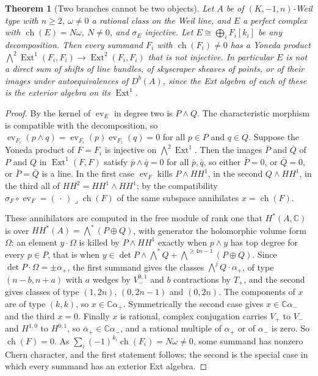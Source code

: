 \documentclass[11pt,reqno]{amsart}
\theoremstyle{plain}
\newtheorem{theorem}{Theorem}[section]
\theoremstyle{definition}
\theoremstyle{remark}
\newcommand{\CC}{\mathbb{C}}
\DeclareMathOperator{\ch}{ch}
\DeclareMathOperator{\Ext}{Ext}
\begin{document}
\begin{theorem}[Two branches cannot be two objects]\label{thm:nosum}
Let $A$ be of $(K,-1,n)$-Weil type with $n\ge2$, $\omega\ne0$ a rational class
on the Weil line, and $E$ a perfect complex with $\ch(E)=N\omega$, $N\ne0$, and
$\sigma_{E}$ injective. Let
$E\cong\bigoplus_{i}F_{i}[k_{i}]$ be any decomposition. Then every summand
$F_{i}$ with $\ch(F_{i})\ne0$ has a Yoneda product
$\bigwedge^{2}\Ext^{1}(F_{i},F_{i})\to\Ext^{2}(F_{i},F_{i})$ that is not
injective. In particular $E$ is not a direct sum of shifts of line bundles,
of skyscraper sheaves of points, or of their images under autoequivalences of
$D^{b}(A)$, since the Ext algebra of each of these is the exterior algebra on
its $\Ext^{1}$.
\end{theorem}

\begin{proof}
By \cite[Theorem~2.11(ii)]{paperII} the kernel of $\operatorname{ev}_{E}$ in degree
two is $P\wedge Q$. The characteristic morphism is compatible with the
decomposition, so $\operatorname{ev}_{F_{i}}(p\wedge q)=
\operatorname{ev}_{F_{i}}(p)\operatorname{ev}_{F_{i}}(q)=0$ for all
$p\in P$ and $q\in Q$. Suppose the Yoneda product of $F=F_{i}$ is injective on
$\bigwedge^{2}\Ext^{1}$. Then the images $\bar P$ and $\bar Q$ of $P$ and $Q$
in $\Ext^{1}(F,F)$ satisfy $\bar p\wedge\bar q=0$ for all $\bar p,\bar q$, so
either $\bar P=0$, or $\bar Q=0$, or $\bar P=\bar Q$ is a line. In the first
case $\operatorname{ev}_{F}$ kills $P\wedge HH^{1}$, in the second
$Q\wedge HH^{1}$, in the third all of $HH^{2}=HH^{1}\wedge HH^{1}$; by the
compatibility $\sigma_{F}\circ\operatorname{ev}_{F}=(\,\cdot\,)\lrcorner
\ch(F)$ of \cite[Setup~2.7]{paperII} the same subspace annihilates $x=\ch(F)$.

These annihilators are computed in the free module of rank one that
$H^{*}(A,\CC)$ is over $HH^{*}(A)=\bigwedge^{*}(P\oplus Q)$, with generator the
holomorphic volume form $\Omega$: an element $y\cdot\Omega$ is killed by
$P\wedge HH^{1}$ exactly when $p\wedge y$ has top degree for every $p\in P$,
that is when $y\in\det P\wedge\bigwedge^{*}Q+\bigwedge^{\ge4n-1}(P\oplus Q)$.
Since $\det P\cdot\Omega=\pm\alpha_{+}$, the first summand gives the classes
$\bigwedge^{j}Q\cdot\alpha_{+}$, of type $(n-b,n+a)$ with $a$ wedges by
$V_{-}^{0,1}$ and $b$ contractions by $T_{+}$, and the second gives classes of
type $(1,2n)$, $(0,2n-1)$ and $(0,2n)$. The components of $x$ are of type
$(k,k)$, so $x\in\CC\alpha_{+}$. Symmetrically the second case gives
$x\in\CC\alpha_{-}$ and the third $x=0$. Finally $x$ is
rational, complex conjugation carries $V_{+}$ to $V_{-}$ and $H^{1,0}$ to
$H^{0,1}$, so $\bar\alpha_{+}\in\CC\alpha_{-}$, and a rational multiple of
$\alpha_{+}$ or of $\alpha_{-}$ is zero. So $\ch(F)=0$. As
$\sum_{i}(-1)^{k_{i}}\ch(F_{i})=N\omega\ne0$, some summand has nonzero
Chern character, and the first statement follows; the second is the special
case in which every summand has an exterior Ext algebra.
\end{proof}
\end{document}
